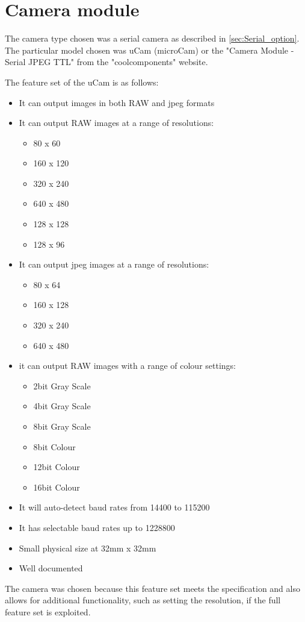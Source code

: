 \section{Camera module}
\label{sec:John_chosen_options}

The camera type chosen was a serial camera as described in \ref{sec:Serial_option}. The particular model chosen was uCam (microCam) or the "Camera Module - Serial JPEG TTL" from the "coolcomponents" website.

The feature set of the uCam is as follows:
	\begin{itemize}
		\item It can output images in both RAW and jpeg formats
		\item It can output RAW images at a range of resolutions:
		\begin{itemize}
			\item 80 x 60
			\item 160 x 120
			\item 320 x 240
			\item 640 x 480
			\item 128 x 128
			\item 128 x 96
		\end{itemize}
		\item It can output jpeg images at a range of resolutions:
		\begin{itemize}
			\item 80 x 64
			\item 160 x 128
			\item 320 x 240
			\item 640 x 480
		\end{itemize}
		\item it can output RAW images with a range of colour settings:
		\begin{itemize}
			\item 2bit Gray Scale
			\item 4bit Gray Scale
			\item 8bit Gray Scale
			\item 8bit Colour
			\item 12bit Colour
			\item 16bit Colour
		\end{itemize}
		\item It will auto-detect baud rates from 14400 to 115200
		\item It has selectable baud rates up to 1228800
		\item Small physical size at 32mm x 32mm
		\item Well documented
	\end{itemize}

The camera was chosen because this feature set meets the specification and also allows for additional functionality, such as setting the resolution, if the full feature set is exploited.